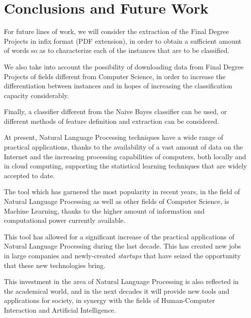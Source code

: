 \section{Conclusions and Future Work}

For future lines of work, we will consider the extraction of the Final Degree Projects in infix format (PDF extension), in order to obtain a sufficient amount of words so as to characterize each of the instances that are to be classified.

We also take into account the possibility of downloading data from Final Degree Projects of fields different from Computer Science, in order to increase the differentiation between instances and in hopes of increasing the classification capacity considerably.

Finally, a classifier different from the Naive Bayes classifier can be used, or different methods of feature definition and extraction can be considered.

\vskip 20pt

At present, Natural Language Processing techniques have a wide range of practical applications, thanks to the availability of a vast amount of data on the Internet and the increasing processing capabilities of computers, both locally and in cloud computing, supporting the statistical learning techniques that are widely accepted to date.

The tool which has garnered the most popularity in recent years, in the field of Natural Language Processing as well as other fields of Computer Science, is Machine Learning, thanks to the higher amount of information and computational power currently available.

This tool has allowed for a significant increase of the practical applications of Natural Language Processing during the last decade. This has created new jobs in large companies and newly-created \textit{startups} that have seized the opportunity that these new technologies bring.

This investment in the area of Natural Language Processing is also reflected in the academical world, and in the next decades it will provide new tools and applications for society, in synergy with the fields of Human-Computer Interaction and Artificial Intelligence.